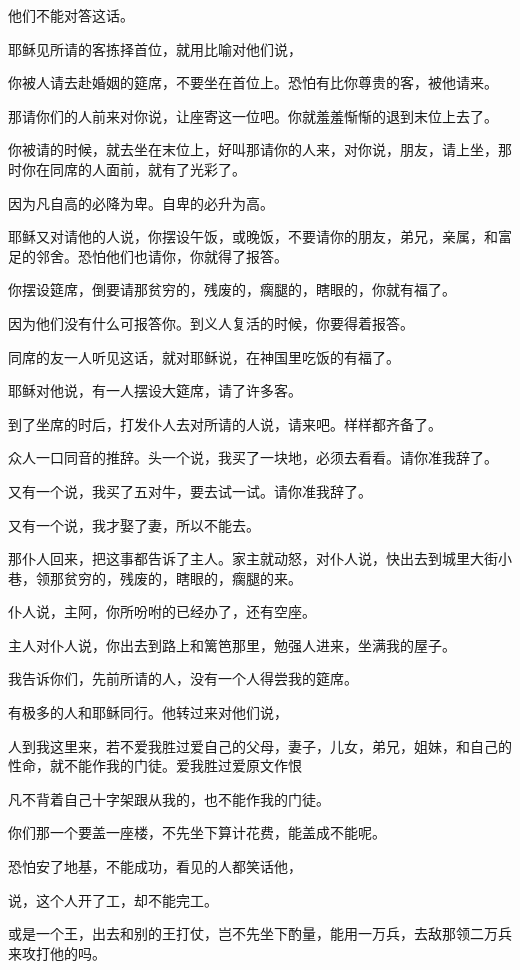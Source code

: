 \documentclass[12pt,oneside]{book}
\begin{document}
他们不能对答这话。

耶稣见所请的客拣择首位，就用比喻对他们说，

你被人请去赴婚姻的筵席，不要坐在首位上。恐怕有比你尊贵的客，被他请来。

那请你们的人前来对你说，让座寄这一位吧。你就羞羞惭惭的退到末位上去了。

你被请的时候，就去坐在末位上，好叫那请你的人来，对你说，朋友，请上坐，那时你在同席的人面前，就有了光彩了。

因为凡自高的必降为卑。自卑的必升为高。

耶稣又对请他的人说，你摆设午饭，或晚饭，不要请你的朋友，弟兄，亲属，和富足的邻舍。恐怕他们也请你，你就得了报答。

你摆设筵席，倒要请那贫穷的，残废的，瘸腿的，瞎眼的，你就有福了。

因为他们没有什么可报答你。到义人复活的时候，你要得着报答。

同席的友一人听见这话，就对耶稣说，在神国里吃饭的有福了。

耶稣对他说，有一人摆设大筵席，请了许多客。

到了坐席的时后，打发仆人去对所请的人说，请来吧。样样都齐备了。

众人一口同音的推辞。头一个说，我买了一块地，必须去看看。请你准我辞了。

又有一个说，我买了五对牛，要去试一试。请你准我辞了。

又有一个说，我才娶了妻，所以不能去。

那仆人回来，把这事都告诉了主人。家主就动怒，对仆人说，快出去到城里大街小巷，领那贫穷的，残废的，瞎眼的，瘸腿的来。

仆人说，主阿，你所吩咐的已经办了，还有空座。

主人对仆人说，你出去到路上和篱笆那里，勉强人进来，坐满我的屋子。

我告诉你们，先前所请的人，没有一个人得尝我的筵席。

有极多的人和耶稣同行。他转过来对他们说，

人到我这里来，若不爱我胜过爱自己的父母，妻子，儿女，弟兄，姐妹，和自己的性命，就不能作我的门徒。爱我胜过爱原文作恨

凡不背着自己十字架跟从我的，也不能作我的门徒。

你们那一个要盖一座楼，不先坐下算计花费，能盖成不能呢。

恐怕安了地基，不能成功，看见的人都笑话他，

说，这个人开了工，却不能完工。

或是一个王，出去和别的王打仗，岂不先坐下酌量，能用一万兵，去敌那领二万兵来攻打他的吗。
\end{document}
